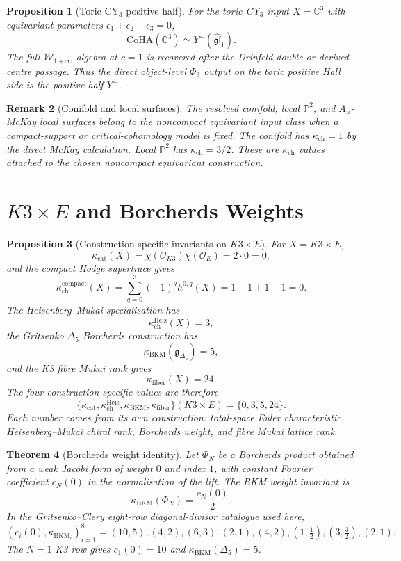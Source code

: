 \documentclass[11pt]{article}
\newtheorem{theorem}{Theorem}[section]
\newtheorem{proposition}[theorem]{Proposition}
\newtheorem{remark}[theorem]{Remark}
\providecommand{\bP}{\mathbb{P}}
\providecommand{\bC}{\mathbb{C}}
\providecommand{\cO}{\mathcal{O}}
\providecommand{\cW}{\mathcal{W}}
\providecommand{\fgl}{\mathfrak{gl}}
\providecommand{\CoHA}{\mathrm{CoHA}}
\providecommand{\kch}{\kappa_{\mathrm{ch}}}
\providecommand{\kcat}{\kappa_{\mathrm{cat}}}
\providecommand{\kBKM}{\kappa_{\mathrm{BKM}}}
\providecommand{\kfib}{\kappa_{\mathrm{fiber}}}
\begin{document}
\begin{proposition}[Toric CY$_3$ positive half]
\label{prop:c3-positive-half}
For the toric CY$_3$ input $X=\bC^3$ with equivariant parameters
$\epsilon_1+\epsilon_2+\epsilon_3=0$,
\[
 \CoHA(\bC^3)\simeq Y^+(\widehat{\fgl}_1).
\]
The full $\cW_{1+\infty}$ algebra at $c=1$ is recovered after the
Drinfeld double or derived-centre passage.  Thus the direct
object-level $\Phi_3$ output on the toric positive Hall side is the
positive half $Y^+$.
\end{proposition}

\begin{remark}[Conifold and local surfaces]
\label{rem:noncompact-examples}
The resolved conifold, local $\bP^2$, and $A_n$-McKay local surfaces
belong to the noncompact equivariant input class when a compact-support
or critical-cohomology model is fixed.  The conifold has
$\kch=1$ by the direct McKay calculation.  Local $\bP^2$ has
$\kch=3/2$.  These are $\kch$ values attached to the chosen
noncompact equivariant construction.
\end{remark}

\section{\texorpdfstring{$K3\times E$}{K3 x E} and Borcherds Weights}

\begin{proposition}[Construction-specific invariants on $K3\times E$]
\label{prop:k3e-invariants}
For $X=K3\times E$,
\[
 \kcat(X)=\chi(\cO_{K3})\chi(\cO_E)=2\cdot0=0,
\]
and the compact Hodge supertrace gives
\[
 \kch^{\mathrm{compact}}(X)
 =
 \sum_{q=0}^{3}(-1)^qh^{0,q}(X)
 =
 1-1+1-1
 =
 0.
\]
The Heisenberg--Mukai specialisation has
\[
 \kch^{\mathrm{Heis}}(X)=3,
\]
the Gritsenko $\Delta_5$ Borcherds construction has
\[
 \kBKM(\mathfrak g_{\Delta_5})=5,
\]
and the K3 fibre Mukai rank gives
\[
 \kfib(X)=24.
\]
The four construction-specific values are therefore
\[
 \{\kcat,\kch^{\mathrm{Heis}},\kBKM,\kfib\}(K3\times E)
 =
 \{0,3,5,24\}.
\]
Each number comes from its own construction: total-space Euler
characteristic, Heisenberg--Mukai chiral rank, Borcherds weight, and
fibre Mukai lattice rank.
\end{proposition}

\begin{theorem}[Borcherds weight identity]
\label{thm:borcherds-weight}
Let $\Phi_N$ be a Borcherds product obtained from a weak Jacobi form of
weight $0$ and index $1$, with constant Fourier coefficient $c_N(0)$ in
the normalisation of the lift.  The BKM weight invariant is
\[
 \kBKM(\Phi_N)=\frac{c_N(0)}{2}.
\]
In the Gritsenko--Clery eight-row diagonal-divisor catalogue used here,
\[
 (c_i(0),\kBKM_i)_{i=1}^{8}
 =
 (10,5),(4,2),(6,3),(2,1),(4,2),(1,\tfrac12),(3,\tfrac32),(2,1).
\]
The $N=1$ K3 row gives $c_1(0)=10$ and
$\kBKM(\Delta_5)=5$.
\end{theorem}
\end{document}
